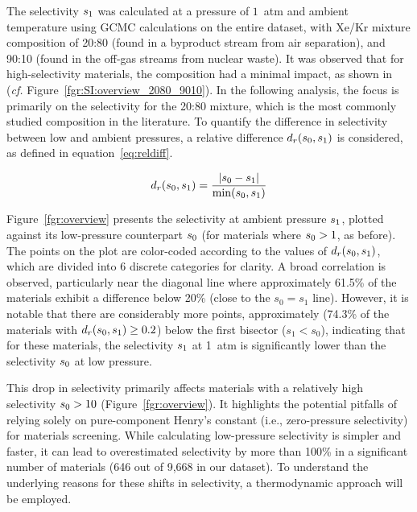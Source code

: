 \documentclass[main.tex]{subfiles}
\begin{document}
The selectivity $s_{\text{1}}$ was calculated at a pressure of $1$~atm and ambient temperature using GCMC calculations on the entire dataset, with Xe/Kr mixture composition of 20:80 (found in a byproduct stream from air separation\autocite{kerry2007industrial}), and 90:10 (found in the off-gas streams from nuclear waste\autocite{auerbach2003handbook}). It was observed that for high-selectivity materials, the composition had a minimal impact, as shown in (\emph{cf.} Figure~\ref{fgr:SI:overview_2080_9010}). In the following analysis, the focus is primarily on the selectivity for the 20:80 mixture, which is the most commonly studied composition in the literature. To quantify the difference in selectivity between low and ambient pressures, a relative difference $d_r(s_{\text{0}},s_{\text{1}})$ is considered, as defined in equation~\ref{eq:reldiff}.

\begin{equation}\label{eq:reldiff}
    d_r(s_{\text{0}},s_{\text{1}}) = \dfrac{\lvert s_{\text{0}} - s_{\text{1}} \rvert}{\min(s_{\text{0}},s_{\text{1}})}
\end{equation}

Figure~\ref{fgr:overview} presents the selectivity at ambient pressure $s_{\text{1}}$, plotted against its low-pressure counterpart $s_{\text{0}}$ (for materials where $s_{\text{0}} > 1$, as before). The points on the plot are color-coded according to the values of $d_r(s_{\text{0}},s_{\text{1}})$, which are divided into 6 discrete categories for clarity. A broad correlation is observed, particularly near the diagonal line where approximately {61.5\%} of the materials exhibit a difference below {20\%} (close to the $s_0 = s_1$ line). 
However, it is notable that there are considerably more points, approximately ({74.3\%} of the materials with $d_r(s_{\text{0}},s_{\text{1}})\ge 0.2$) below the first bisector ($s_1 < s_0$), indicating that for these materials, the selectivity $s_{\text{1}}$ at 1~atm is significantly lower than the selectivity $s_{\text{0}}$ at low pressure.

This drop in selectivity primarily affects materials with a relatively high selectivity $s_{\text{0}} > 10$ (Figure~\ref{fgr:overview}). It highlights the potential pitfalls of relying solely on pure-component Henry's constant (i.e., zero-pressure selectivity) for materials screening. While calculating low-pressure selectivity is simpler and faster, it can lead to overestimated selectivity by more than {100\%} in a significant number of materials (646 out of 9,668 in our dataset). To understand the underlying reasons for these shifts in selectivity, a thermodynamic approach will be employed.
\end{document}

